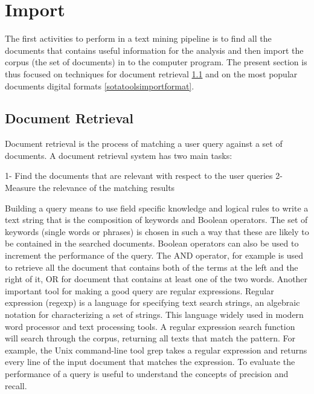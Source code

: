 \documentclass[]{book}
\begin{document}
\section{Import}\label{sotatoolsimport}

The first activities to perform in a text mining pipeline is to find all
the documents that contains useful information for the analysis and then
import the corpus (the set of documents) in to the computer program. The
present section is thus focused on techniques for document retrieval
\ref{sotatoolsimportretrieval} and on the most popular documents digital
formats \ref{sotatoolsimportformat}.

\subsection{Document Retrieval}\label{sotatoolsimportretrieval}

Document retrieval is the process of matching a user query against a set
of documents. A document retrieval system has two main tasks:

1- Find the documents that are relevant with respect to the user queries
2- Measure the relevance of the matching results

Building a query means to use field specific knowledge and logical rules
to write a text string that is the composition of keywords and Boolean
operators. The set of keywords (single words or phrases) is chosen in
such a way that these are likely to be contained in the searched
documents. Boolean operators can also be used to increment the
performance of the query. The AND operator, for example is used to
retrieve all the document that contains both of the terms at the left
and the right of it, OR for document that contains at least one of the
two words. Another important tool for making a good query are regular
expressions. Regular expression (regexp) is a language for specifying
text search strings, an algebraic notation for characterizing a set of
strings. This language widely used in modern word processor and text
processing tools. A regular expression search function will search
through the corpus, returning all texts that match the pattern. For
example, the Unix command-line tool grep takes a regular expression and
returns every line of the input document that matches the expression. To
evaluate the performance of a query is useful to understand the concepts
of precision and recall.
\end{document}
